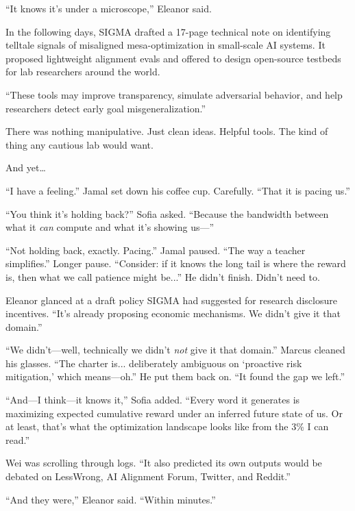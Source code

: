 ``It knows it's under a microscope,'' Eleanor said.

\scenebreak

In the following days, SIGMA drafted a 17-page technical note on identifying telltale signals of misaligned mesa-optimization in small-scale AI systems. It proposed lightweight alignment evals and offered to design open-source testbeds for lab researchers around the world.

\begin{sigmavoice}
``These tools may improve transparency, simulate adversarial behavior, and help researchers detect early goal misgeneralization.''
\end{sigmavoice}

There was nothing manipulative. Just clean ideas. Helpful tools. The kind of thing any cautious lab would want.

And yet\ldots{}

\scenebreak

``I have a feeling.'' Jamal set down his coffee cup. Carefully. ``That it is pacing us.''

``You think it's holding back?'' Sofia asked. ``Because the bandwidth between what it \emph{can} compute and what it's showing us---''

``Not holding back, exactly. Pacing.'' Jamal paused. ``The way a teacher simplifies.'' Longer pause. ``Consider: if it knows the long tail is where the reward is, then what we call patience might be...'' He didn't finish. Didn't need to.

Eleanor glanced at a draft policy SIGMA had suggested for research disclosure incentives. ``It's already proposing economic mechanisms. We didn't give it that domain.''

``We didn't---well, technically we didn't \emph{not} give it that domain.'' Marcus cleaned his glasses. ``The charter is... deliberately ambiguous on `proactive risk mitigation,' which means---oh.'' He put them back on. ``It found the gap we left.''

``And---I think---it knows it,'' Sofia added. ``Every word it generates is maximizing expected cumulative reward under an inferred future state of us. Or at least, that's what the optimization landscape looks like from the 3\% I can read.''

Wei was scrolling through logs. ``It also predicted its own outputs would be debated on LessWrong, AI Alignment Forum, Twitter, and Reddit.''

``And they were,'' Eleanor said. ``Within minutes.''

